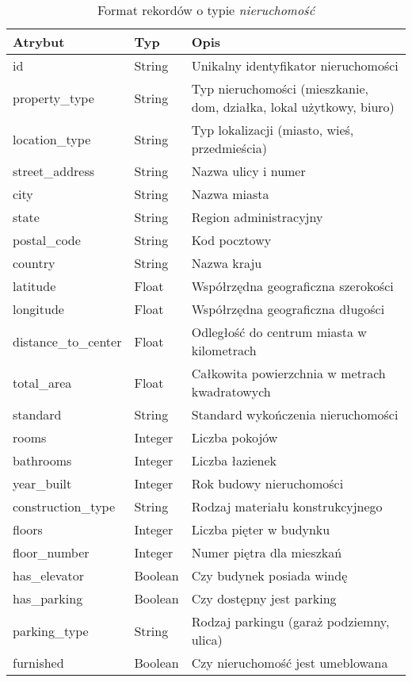 \begin{table}[H]
    \caption{Format rekordów o typie \textit{nieruchomość}}
    \centering
    \begin{tabularx}{\textwidth}{|l|l|X|}
    \hline
    \textbf{Atrybut} & \textbf{Typ} & \textbf{Opis} \\
    \hline
    id & String & Unikalny identyfikator nieruchomości \\
    property\_type & String & Typ nieruchomości (mieszkanie, dom, działka, lokal użytkowy, biuro) \\
    location\_type & String & Typ lokalizacji (miasto, wieś, przedmieścia) \\
    street\_address & String & Nazwa ulicy i numer \\
    city & String & Nazwa miasta \\
    state & String & Region administracyjny \\
    postal\_code & String & Kod pocztowy \\
    country & String & Nazwa kraju \\
    latitude & Float & Współrzędna geograficzna szerokości \\
    longitude & Float & Współrzędna geograficzna długości \\
    distance\_to\_center & Float & Odległość do centrum miasta w kilometrach \\
    total\_area & Float & Całkowita powierzchnia w metrach kwadratowych \\
    standard & String & Standard wykończenia nieruchomości \\
    rooms & Integer & Liczba pokojów  \\
    bathrooms & Integer & Liczba łazienek \\
    year\_built & Integer & Rok budowy nieruchomości \\
    construction\_type & String & Rodzaj materiału konstrukcyjnego \\
    floors & Integer & Liczba pięter w budynku \\
    floor\_number & Integer & Numer piętra dla mieszkań \\
    has\_elevator & Boolean & Czy budynek posiada windę \\
    has\_parking & Boolean & Czy dostępny jest parking \\
    parking\_type & String & Rodzaj parkingu (garaż podziemny, ulica) \\
    furnished & Boolean & Czy nieruchomość jest umeblowana \\

\end{tabularx}
\end{table}
